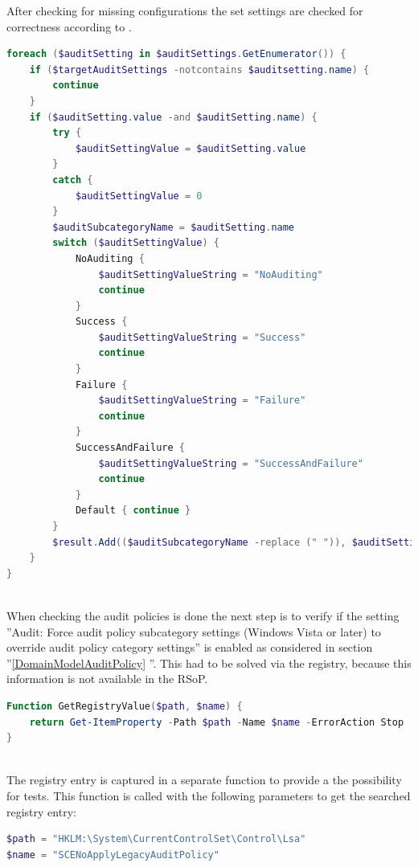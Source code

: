 \clearpage
After checking for missing configurations the set settings are checked for correctness according to .
\begin{lstlisting}[caption=GetAndCheckAuditPolicies: Get configured audit settings from RSoP, language=PowerShell]
foreach ($auditSetting in $auditSettings.GetEnumerator()) {
    if ($targetAuditSettings -notcontains $auditsetting.name) {
        continue
    }
    if ($auditSetting.value -and $auditSetting.name) {
        try {
            $auditSettingValue = $auditSetting.value
        }
        catch {
            $auditSettingValue = 0
        }
        $auditSubcategoryName = $auditSetting.name 
        switch ($auditSettingValue) {
            NoAuditing {  
                $auditSettingValueString = "NoAuditing"
                continue
            }
            Success {
                $auditSettingValueString = "Success"
                continue
            } 
            Failure {
                $auditSettingValueString = "Failure"
                continue
            }
            SuccessAndFailure {
                $auditSettingValueString = "SuccessAndFailure"
                continue
            }
            Default { continue }
        }
        $result.Add(($auditSubcategoryName -replace (" ")), $auditSettingValueString)
    }    
}
\end{lstlisting} \ \\
When checking the audit policies is done the next step is to verify if the setting ''Audit: Force audit policy subcategory settings (Windows Vista or later) to override audit policy category settings'' is enabled as considered in section ''\ref{DomainModelAuditPolicy} ''. This had to be solved via the registry, because this information is not available in the RSoP.

\begin{lstlisting}[caption=GetRegistryValue,language=PowerShell]
Function GetRegistryValue($path, $name) {
    return Get-ItemProperty -Path $path -Name $name -ErrorAction Stop
}
\end{lstlisting} \ \\
The registry entry is captured in a separate function to provide a the possibility for tests. This function is called with the following parameters \cite{ForceAudit} to get the searched registry entry:

\begin{lstlisting}[language=PowerShell]
$path = "HKLM:\System\CurrentControlSet\Control\Lsa"
$name = "SCENoApplyLegacyAuditPolicy"
\end{lstlisting}


